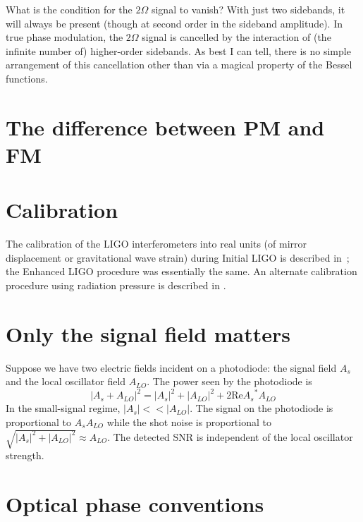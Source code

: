 What is the condition for the $2\Omega$ signal to vanish? With just
two sidebands, it will always be present (though at second order in
the sideband amplitude). In true phase modulation, the $2\Omega$
signal is cancelled by the interaction of (the infinite number of)
higher-order sidebands. As best I can tell, there is no simple
arrangement of this cancellation other than via a magical property of
the Bessel functions.

\section{The difference between PM and FM}

\section{Calibration}

The calibration of the LIGO interferometers into real units (of mirror
displacement or gravitational wave strain) during Initial LIGO is
described in~\cite{KisselCalibrationPaper}; the Enhanced LIGO procedure
was essentially the same.  An alternate calibration procedure using
radiation pressure is described in \cite{Goetz2010Gravitational}.

\section{Only the signal field matters}

Suppose we have two electric fields incident on a photodiode: the
signal field $A_s$ and the local oscillator field $A_{LO}$.  The power
seen by the photodiode is
$$ \left| A_s + A_{LO} \right|^2 = 
   |A_s|^2 + |A_{LO}|^2 + 2 \mathrm{ Re } {A_s}^*A_{LO}$$
In the small-signal regime, $|A_s| << |A_{LO}|$.  The signal on the
photodiode is proportional to $A_s A_{LO}$ while the shot noise is
proportional to $\sqrt{|A_s|^2+|A_{LO}|^2}\approx A_{LO}$.  
  The detected SNR is independent of the local oscillator strength.

\section{Optical phase conventions}

